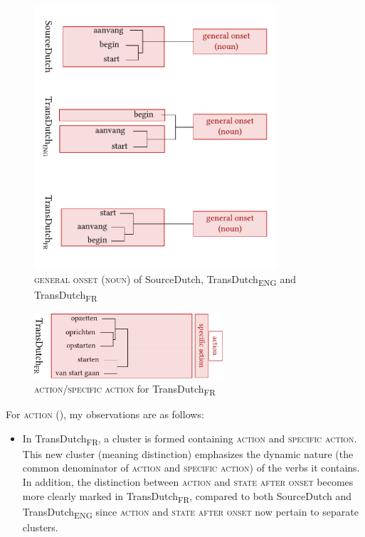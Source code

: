 \begin{figure}[p]
\includegraphics[width=9cm]{figures/tree88.pdf}
\caption{\label{fig:4:85}\textsc{general onset (noun)} of SourceDutch, TransDutch\textsubscript{ENG} and TransDutch\textsubscript{FR}}
\end{figure}

\begin{figure}[p]
\includegraphics[width=7cm]{figures/tree89.pdf}
\caption{\label{fig:4:86}\textsc{action}/\textsc{specific} \textsc{action} for TransDutch\textsubscript{FR}}
\end{figure}

\noindent For \textsc{action} (), my observations are as follows:

\begin{itemize}
\item  In TransDutch\textsubscript{FR}, a cluster is formed containing \textsc{action} and {\textsc{specific}} \textsc{action}. This new cluster (meaning distinction) emphasizes the dynamic nature (the common denominator of \textsc{action} and {\textsc{specific}} \textsc{action}) of the verbs it contains. In addition, the distinction between \textsc{action} and \textsc{state after onset} becomes more clearly marked in TransDutch\textsubscript{FR}, compared to both SourceDutch and TransDutch\textsubscript{ENG} since \textsc{action} and \textsc{state after onset} now pertain to separate clusters.
\end{itemize}

